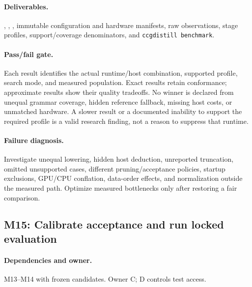 \documentclass[11pt,a4paper]{article}
\begin{document}
\paragraph{Deliverables.} ,
, , immutable
configuration and hardware manifests, raw observations, stage profiles,
support/coverage denominators, and \texttt{ccgdistill benchmark}.

\paragraph{Pass/fail gate.} Each result identifies the actual runtime/host
combination, supported profile, search mode, and measured population. Exact
results retain conformance; approximate results show their quality tradeoffs.
No winner is declared from unequal grammar coverage, hidden reference
fallback, missing host costs, or unmatched hardware. A slower result or a
documented inability to support the required profile is a valid research
finding, not a reason to suppress that runtime.

\paragraph{Failure diagnosis.} Investigate unequal lowering, hidden host
deduction, unreported truncation, omitted unsupported cases, different
pruning/acceptance policies, startup exclusions, GPU/CPU conflation, data-order
effects, and normalization outside the measured path. Optimize measured
bottlenecks only after restoring a fair comparison.


\subsection{M15: Calibrate acceptance and run locked evaluation}

\paragraph{Dependencies and owner.} M13--M14 with frozen candidates. Owner C; D controls test access.
\end{document}
